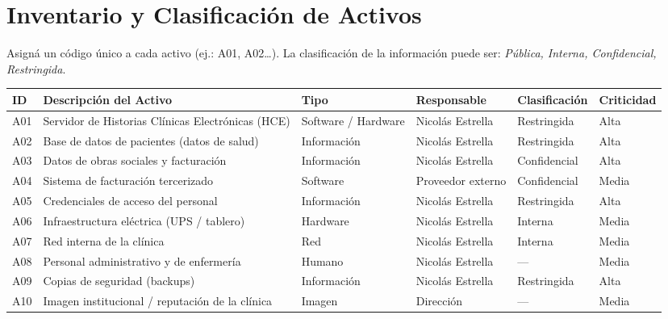 \documentclass[11pt,a4paper]{article}
\begin{document}
\section{Inventario y Clasificación de Activos}

Asigná un código único a cada activo (ej.: A01, A02\ldots). La clasificación de la información puede ser: \textit{Pública, Interna, Confidencial, Restringida}.

\begin{center}
\small
\renewcommand{\arraystretch}{1.6}
\begin{tabularx}{\textwidth}{@{} >{\centering\arraybackslash}p{1cm} X >{\raggedright\arraybackslash}p{2.2cm} >{\raggedright\arraybackslash}p{2.3cm} >{\raggedright\arraybackslash}p{2.3cm} >{\centering\arraybackslash}p{1.8cm} @{}}
\toprule
\textbf{ID} & \textbf{Descripción del Activo} & \textbf{Tipo} & \textbf{Responsable} & \textbf{Clasificación} & \textbf{Criticidad} \\
\midrule
A01 & Servidor de Historias Clínicas Electrónicas (HCE) & Software / Hardware & Nicolás Estrella & Restringida & Alta \\
A02 & Base de datos de pacientes (datos de salud) & Información & Nicolás Estrella & Restringida & Alta \\
A03 & Datos de obras sociales y facturación & Información & Nicolás Estrella & Confidencial & Alta \\
A04 & Sistema de facturación tercerizado & Software & Proveedor externo & Confidencial & Media \\
A05 & Credenciales de acceso del personal & Información & Nicolás Estrella & Restringida & Alta \\
A06 & Infraestructura eléctrica (UPS / tablero) & Hardware & Nicolás Estrella & Interna & Media \\
A07 & Red interna de la clínica & Red & Nicolás Estrella & Interna & Media \\
A08 & Personal administrativo y de enfermería & Humano & Nicolás Estrella & --- & Media \\
A09 & Copias de seguridad (backups) & Información & Nicolás Estrella & Restringida & Alta \\
A10 & Imagen institucional / reputación de la clínica & Imagen & Dirección & --- & Media \\
\bottomrule
\end{tabularx}
\end{center}
\end{document}

